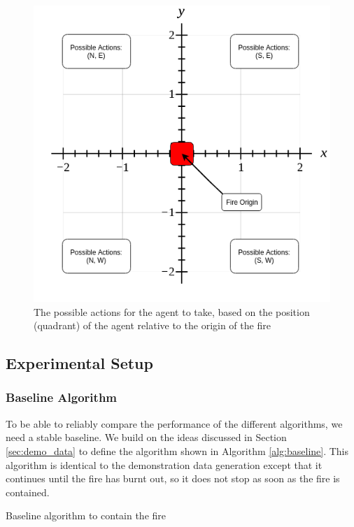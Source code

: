\begin{figure}[h]
    \centering
    \includegraphics[width=1\linewidth]{img/Demo-data_Baseline.png}
    \caption{The possible actions for the agent to take, based on the position (quadrant) of the agent relative to the origin of the fire}
    \label{fig:demodata}
\end{figure}



\subsection{Experimental Setup}\label{sec:experiment}

\subsubsection{Baseline Algorithm}\label{sec:baseline}
To be able to reliably compare the performance of the different algorithms, we need a stable baseline. We build on the ideas discussed in Section \ref{sec:demo_data} to define the algorithm shown in Algorithm \ref{alg:baseline}. This algorithm is identical to the demonstration data generation except that it continues until the fire has burnt out, so it does not stop as soon as the fire is contained.

\begin{algorithm}
  \caption{Baseline algorithm to contain the fire}
  \label{alg:baseline}
  \begin{algorithmic}[1]
    \EndIf
    \EndWhile
    \State {}
    \EndProcedure
  \end{algorithmic}
\end{algorithm}

